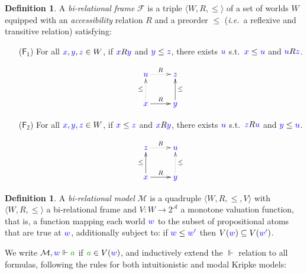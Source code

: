 \documentclass[a4paper]{article}
\theoremstyle{plain}
\theoremstyle{definition}
\newtheorem{definition}[theorem]{Definition}
\newcommand*{\fm}[1]{{\color{notgreen}{#1}}}
\newcommand*{\lb}[1]{{\color{blue}{#1}}}
\newcommand*{\rel}{R}
\newcommand*{\accs}[2]{\lb{#1}R\lb{#2}}
\newcommand*{\futs}[2]{\lb{#1}\le{\lb{#2}}}
\newcommand*{\rn}[1]  {\ensuremath{\mathsf{#1}}}
\newcommand{\M}{\mathcal{M}}
\newcommand{\F}{\mathcal{F}}
\begin{document}
 \begin{definition}
 	A \emph{bi-relational frame} $\F$ is a triple $\langle W, \rel, \le \rangle$ 
 	of a set of worlds $W$ equipped with an \emph{accessibility} relation $\rel$ and a preorder $\le$ (\emph{i.e.}\ a reflexive and transitive relation) satisfying:
 	\begin{enumerate}
 		\item[($\rn{F_1}$)] For all $\lb x, \lb y, \lb z \in W$, if $\accs xy$ and $\futs yz$, there exists $\lb u$ s.t.~$\futs xu$ and $\accs uz$.
 		
 		\begin{equation*}
 			\xymatrix{
 				\lb u \ar@{.>}[r]^R  & \lb z \\
 				\lb x \ar@{.>}[u]^{\le} \ar@{->}[r]^R  & \lb y \ar@{->}[u]_{\le}
 			}
 		\end{equation*}
 		
 		\item[($\rn{F_2}$)] For all $\lb x, \lb y, \lb z \in W$, if $\futs xz$ and $\accs xy$, there exists $\lb u$ s.t.~$\accs zu$ and $\futs yu$.
 		
 		\begin{equation*}
 			\xymatrix{
 				\lb z\ar@{.>}[r]^R & \lb u \\
 				\lb x \ar@{->}[u]^{\le} \ar@{->}[r]^R & \lb y \ar@{.>}[u]_{\le}
 			}
 		\end{equation*}
 	\end{enumerate}
 \end{definition}
 
 \begin{definition}
 	\label{model}
 	A \emph{bi-relational model} $\M$ is a quadruple $\langle W, \rel,\le,V \rangle$ with $\langle W, \rel, \le \rangle$ a bi-relational frame and $V\colon W \to 2^\mathcal{A}$ a monotone valuation function, that is, a function mapping each world $\lb w$ to the subset of propositional atoms that are true at $\lb w$, additionally subject to:
 	if $\lb w \le \lb{w'}$ then $V(\lb w)\subseteq V(\lb{w'})$.
 \end{definition}
 
 We write $\M, \lb w \Vdash \fm a$ if $\fm a \in V(\lb w)$, and inductively extend the $\Vdash$ relation to all formulas, following the rules for both intuitionistic and modal Kripke models:
 
\end{document}
